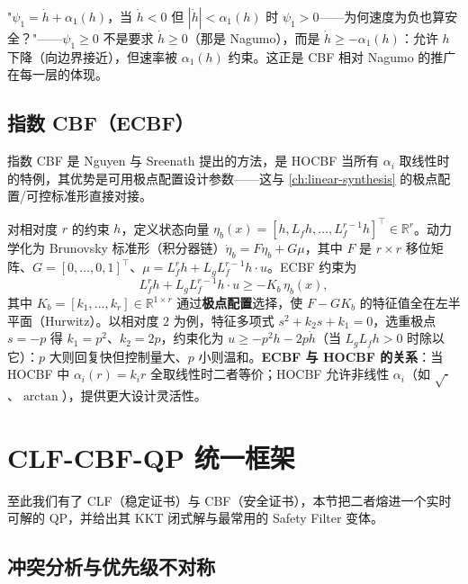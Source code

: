 \begin{pitfall}
"$\psi_1=\dot h+\alpha_1(h)$，当 $\dot h<0$ 但 $|\dot h|<\alpha_1(h)$ 时 $\psi_1>0$——为何速度为负也算安全？"——$\psi_1\ge0$ 不是要求 $\dot h\ge0$（那是 Nagumo），而是 $\dot h\ge-\alpha_1(h)$：允许 $h$ 下降（向边界接近），但速率被 $\alpha_1(h)$ 约束。这正是 CBF 相对 Nagumo 的推广在每一层的体现。
\end{pitfall}

\subsection{指数 CBF（ECBF）}
\label{sec:ecbf}

指数 CBF 是 Nguyen 与 Sreenath \cite{nguyen2016ecbf} 提出的方法，是 HOCBF 当所有 $\alpha_i$ 取线性时的特例，其优势是可用极点配置设计参数——这与 \cref{ch:linear-synthesis} 的极点配置/可控标准形直接对接。

对相对度 $r$ 的约束 $h$，定义状态向量 $\eta_b(x)=[h,L_fh,\dots,L_f^{r-1}h]^\top\in\mathbb R^r$。动力学化为 Brunovsky 标准形（积分器链）$\dot\eta_b=F\eta_b+G\mu$，其中 $F$ 是 $r\times r$ 移位矩阵、$G=[0,\dots,0,1]^\top$、$\mu=L_f^rh+L_gL_f^{r-1}h\cdot u$。ECBF 约束为
\begin{equation}
L_f^rh+L_gL_f^{r-1}h\cdot u\ge-K_b\,\eta_b(x),
\label{eq:ecbf}
\end{equation}
其中 $K_b=[k_1,\dots,k_r]\in\mathbb R^{1\times r}$ 通过\textbf{极点配置}选择，使 $F-GK_b$ 的特征值全在左半平面（Hurwitz）。以相对度 $2$ 为例，特征多项式 $s^2+k_2s+k_1=0$，选重极点 $s=-p$ 得 $k_1=p^2$、$k_2=2p$，约束化为 $u\ge-p^2h-2p\dot h$（当 $L_gL_fh>0$ 时除以它）：$p$ 大则回复快但控制量大、$p$ 小则温和。\textbf{ECBF 与 HOCBF 的关系}：当 HOCBF 中 $\alpha_i(r)=k_i r$ 全取线性时二者等价；HOCBF 允许非线性 $\alpha_i$（如 $\sqrt\cdot$、$\arctan$），提供更大设计灵活性。

\section{CLF-CBF-QP 统一框架}
\label{sec:cbf-qp}

至此我们有了 CLF（稳定证书）与 CBF（安全证书），本节把二者熔进一个实时可解的 QP，并给出其 KKT 闭式解与最常用的 Safety Filter 变体。

\subsection{冲突分析与优先级不对称}

